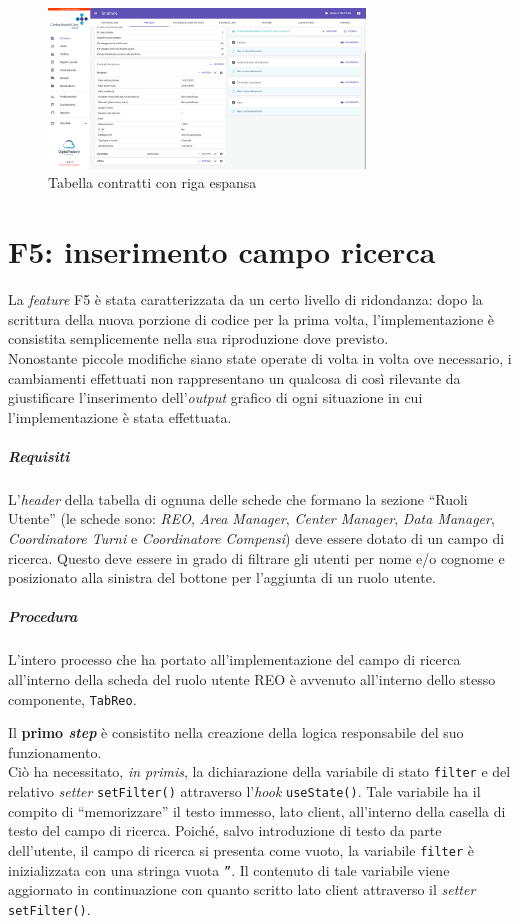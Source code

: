 \begin{figure}[H]
    \centering
    \includegraphics[width=0.75\textwidth]{images/capitolo5/f4_rentalAgreement/RentalAgreement_notCollapsed.png} 
    \caption{Tabella contratti con riga espansa} 
    \label{fig:RentalAgreement_notCollapsed}
\end{figure}

\newpage\section{F5: inserimento campo ricerca}
\label{sec:F5: inserimento campo ricerca}
La \textit{feature} F5 è stata caratterizzata da un certo livello di ridondanza: dopo la scrittura della nuova porzione di codice per la prima volta, l'implementazione è consistita semplicemente nella sua riproduzione dove previsto.\\
Nonostante piccole modifiche siano state operate di volta in volta ove necessario, i cambiamenti effettuati non rappresentano un qualcosa di così rilevante da giustificare  
l'inserimento dell'\textit{output} grafico di ogni situazione in cui l'implementazione è stata effettuata.

\subparagraph{Requisiti} 
L'\textit{header} della tabella di ognuna delle schede che formano la sezione “Ruoli Utente” (le schede sono: \textit{REO}, \textit{Area Manager}, \textit{Center Manager}, \textit{Data Manager}, \textit{Coordinatore Turni} e \textit{Coordinatore Compensi}) deve essere dotato di un campo di ricerca. Questo deve essere in grado di filtrare gli utenti per nome e/o cognome e posizionato alla sinistra del bottone per l'aggiunta di un ruolo utente.

\subparagraph{Procedura}
L'intero processo che ha portato all'implementazione del campo di ricerca all'interno della scheda del ruolo utente REO è avvenuto all'interno dello stesso componente, \texttt{TabReo}.

Il \textbf{primo \textit{step}} è consistito nella creazione della logica responsabile del suo funzionamento.\\
Ciò ha necessitato, \textit{in primis}, la dichiarazione della variabile di stato \texttt{filter} e del relativo \textit{setter} \texttt{setFilter()} attraverso l'\textit{hook} \texttt{useState()}. Tale variabile ha il compito di “memorizzare” il testo immesso, lato client, all'interno della casella di testo del campo di ricerca. Poiché, salvo introduzione di testo da parte dell'utente, il campo di ricerca si presenta come vuoto, la variabile \texttt{filter} è inizializzata con una stringa vuota \texttt{''}. Il contenuto di tale variabile viene aggiornato in continuazione con quanto scritto lato client attraverso il \textit{setter} \texttt{setFilter()}.

